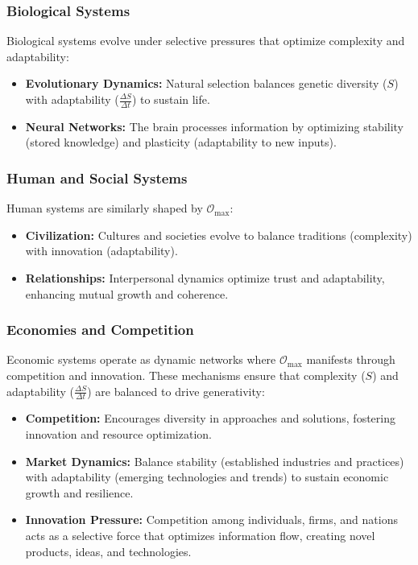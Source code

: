 \documentclass[12pt]{article}
\begin{document}
\subsubsection{Biological Systems}
Biological systems evolve under selective pressures that optimize complexity and adaptability:
\begin{itemize}
    \item \textbf{Evolutionary Dynamics:} Natural selection balances genetic diversity (\( S \)) with adaptability (\( \frac{\Delta S}{\Delta t} \)) to sustain life.
    \item \textbf{Neural Networks:} The brain processes information by optimizing stability (stored knowledge) and plasticity (adaptability to new inputs).
\end{itemize}

\subsubsection{Human and Social Systems}
Human systems are similarly shaped by \( \mathcal{O}_{\text{max}} \):
\begin{itemize}
    \item \textbf{Civilization:} Cultures and societies evolve to balance traditions (complexity) with innovation (adaptability).
    \item \textbf{Relationships:} Interpersonal dynamics optimize trust and adaptability, enhancing mutual growth and coherence.
\end{itemize}

\subsubsection{Economies and Competition}
Economic systems operate as dynamic networks where \( \mathcal{O}_{\text{max}} \) manifests through competition and innovation. These mechanisms ensure that complexity (\( S \)) and adaptability (\( \frac{\Delta S}{\Delta t} \)) are balanced to drive generativity:
\begin{itemize}
    \item \textbf{Competition:} Encourages diversity in approaches and solutions, fostering innovation and resource optimization.
    \item \textbf{Market Dynamics:} Balance stability (established industries and practices) with adaptability (emerging technologies and trends) to sustain economic growth and resilience.
    \item \textbf{Innovation Pressure:} Competition among individuals, firms, and nations acts as a selective force that optimizes information flow, creating novel products, ideas, and technologies.
\end{itemize}
\end{document}
